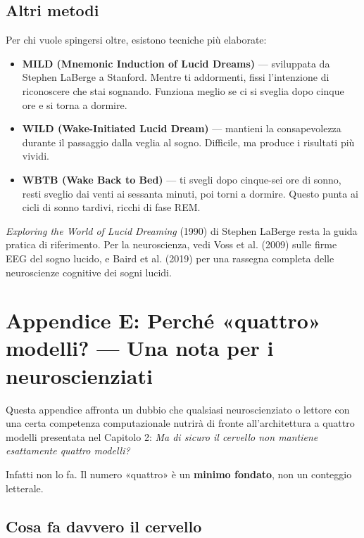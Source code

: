 \documentclass[11pt, twoside, openright]{book}
\begin{document}
\section*{Altri metodi}

Per chi vuole spingersi oltre, esistono tecniche più elaborate:

\begin{itemize}
  \item \textbf{MILD (Mnemonic Induction of Lucid Dreams)} --- sviluppata da Stephen LaBerge a Stanford. Mentre ti addormenti, fissi l'intenzione di riconoscere che stai sognando. Funziona meglio se ci si sveglia dopo cinque ore e si torna a dormire.
  \item \textbf{WILD (Wake-Initiated Lucid Dream)} --- mantieni la consapevolezza durante il passaggio dalla veglia al sogno. Difficile, ma produce i risultati più vividi.
  \item \textbf{WBTB (Wake Back to Bed)} --- ti svegli dopo cinque-sei ore di sonno, resti sveglio dai venti ai sessanta minuti, poi torni a dormire. Questo punta ai cicli di sonno tardivi, ricchi di fase REM.
\end{itemize}

\textit{Exploring the World of Lucid Dreaming} (1990) di Stephen LaBerge resta la guida pratica di riferimento. Per la neuroscienza, vedi Voss et al. (2009) sulle firme EEG del sogno lucido, e Baird et al. (2019) per una rassegna completa delle neuroscienze cognitive dei sogni lucidi.


\chapter*{Appendice E: Perché «quattro» modelli? --- Una nota per i neuroscienziati}

Questa appendice affronta un dubbio che qualsiasi neuroscienziato o lettore con una certa competenza computazionale nutrirà di fronte all'architettura a quattro modelli presentata nel Capitolo 2: \textit{Ma di sicuro il cervello non mantiene esattamente quattro modelli?}

Infatti non lo fa. Il numero «quattro» è un \textbf{minimo fondato}, non un conteggio letterale.

\section*{Cosa fa davvero il cervello}
\end{document}
